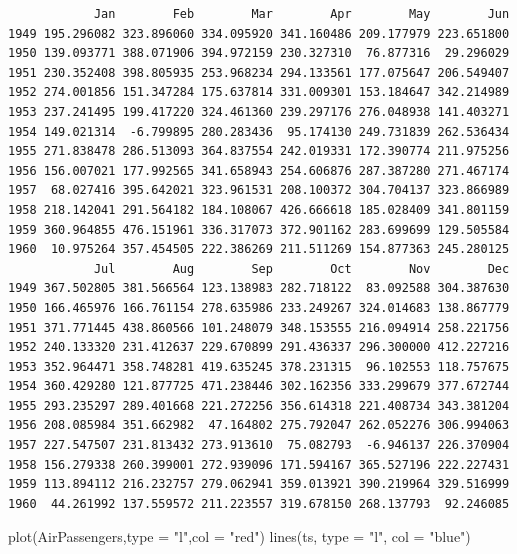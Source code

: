 \documentclass[
  letterpaper,
  DIV=11,
  numbers=noendperiod]{scrreprt}
\newenvironment{Shaded}{\begin{snugshade}}{\end{snugshade}}
\newcommand{\AttributeTok}[1]{\textcolor[rgb]{0.40,0.45,0.13}{#1}}
\newcommand{\FunctionTok}[1]{\textcolor[rgb]{0.28,0.35,0.67}{#1}}
\newcommand{\NormalTok}[1]{\textcolor[rgb]{0.00,0.23,0.31}{#1}}
\newcommand{\StringTok}[1]{\textcolor[rgb]{0.13,0.47,0.30}{#1}}
\begin{document}
\begin{verbatim}
            Jan        Feb        Mar        Apr        May        Jun
1949 195.296082 323.896060 334.095920 341.160486 209.177979 223.651800
1950 139.093771 388.071906 394.972159 230.327310  76.877316  29.296029
1951 230.352408 398.805935 253.968234 294.133561 177.075647 206.549407
1952 274.001856 151.347284 175.637814 331.009301 153.184647 342.214989
1953 237.241495 199.417220 324.461360 239.297176 276.048938 141.403271
1954 149.021314  -6.799895 280.283436  95.174130 249.731839 262.536434
1955 271.838478 286.513093 364.837554 242.019331 172.390774 211.975256
1956 156.007021 177.992565 341.658943 254.606876 287.387280 271.467174
1957  68.027416 395.642021 323.961531 208.100372 304.704137 323.866989
1958 218.142041 291.564182 184.108067 426.666618 185.028409 341.801159
1959 360.964855 476.151961 336.317073 372.901162 283.699699 129.505584
1960  10.975264 357.454505 222.386269 211.511269 154.877363 245.280125
            Jul        Aug        Sep        Oct        Nov        Dec
1949 367.502805 381.566564 123.138983 282.718122  83.092588 304.387630
1950 166.465976 166.761154 278.635986 233.249267 324.014683 138.867779
1951 371.771445 438.860566 101.248079 348.153555 216.094914 258.221756
1952 240.133320 231.412637 229.670899 291.436337 296.300000 412.227216
1953 352.964471 358.748281 419.635245 378.231315  96.102553 118.757675
1954 360.429280 121.877725 471.238446 302.162356 333.299679 377.672744
1955 293.235297 289.401668 221.272256 356.614318 221.408734 343.381204
1956 208.085984 351.662982  47.164802 275.792047 262.052276 306.994063
1957 227.547507 231.813432 273.913610  75.082793  -6.946137 226.370904
1958 156.279338 260.399001 272.939096 171.594167 365.527196 222.227431
1959 113.894112 216.232757 279.062941 359.013921 390.219964 329.516999
1960  44.261992 137.559572 211.223557 319.678150 268.137793  92.246085
\end{verbatim}

\begin{Shaded}
\begin{Highlighting}[]
\FunctionTok{plot}\NormalTok{(AirPassengers,}\AttributeTok{type =} \StringTok{"l"}\NormalTok{,}\AttributeTok{col =} \StringTok{"red"}\NormalTok{)}
\FunctionTok{lines}\NormalTok{(ts, }\AttributeTok{type =} \StringTok{"l"}\NormalTok{, }\AttributeTok{col =} \StringTok{"blue"}\NormalTok{)}
\end{Highlighting}
\end{Shaded}
\end{document}
